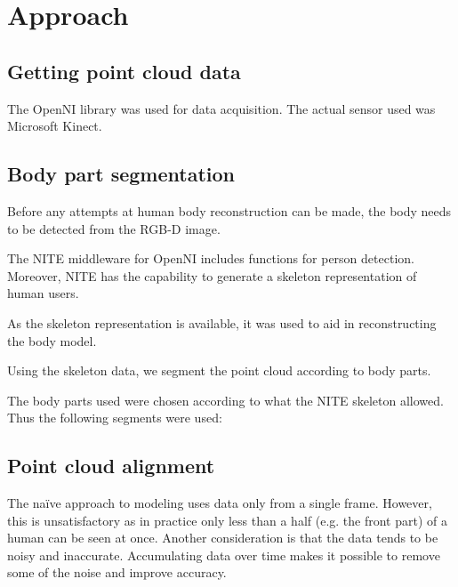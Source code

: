 \chapter{Approach}

\section{Getting point cloud data}


The OpenNI library \citep{OpenNI}
was used for data acquisition. The actual sensor used was Microsoft Kinect.

\section{Body part segmentation}

Before any attempts at human body reconstruction can be made, the body needs to be detected from the RGB-D image. 

The NITE middleware for OpenNI \citep{NITE}
includes functions for person detection. Moreover, NITE has the capability to generate a skeleton representation of human users.

As the skeleton representation is available, it was used to aid in reconstructing the body model.

Using the skeleton data, we segment the point cloud according to body parts.

The body parts used were chosen according to what the NITE skeleton allowed. Thus the following segments were used:


\section{Point cloud alignment}

The naïve approach to modeling uses data only from a single frame. However, this is unsatisfactory as in practice only less than a half (e.g. the front part) of a human can be seen at once. Another consideration is that the data tends to be noisy and inaccurate. Accumulating data over time makes it possible to remove some of the noise and improve accuracy.

